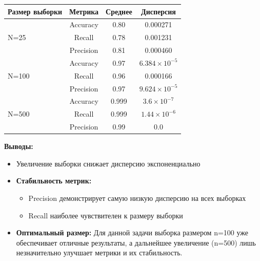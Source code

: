 \begin{table}[h]
    \centering
    \begin{tabular}{lccc}
    \toprule
    \textbf{Размер выборки} & \textbf{Метрика} & \textbf{Среднее} & \textbf{Дисперсия} \\
    \midrule
    \multirow{3}{*}{N=25} 
     & Accuracy  & 0.80  & 0.000271 \\
     & Recall    & 0.78  & 0.001231 \\
     & Precision & 0.81  & 0.000460 \\
    \midrule
    \multirow{3}{*}{N=100}
     & Accuracy  & 0.97  & $6.384 \times 10^{-5}$ \\
     & Recall    & 0.96  & 0.000166 \\
     & Precision & 0.97  & $9.624 \times 10^{-5}$ \\
    \midrule
    \multirow{3}{*}{N=500}
     & Accuracy  & 0.999 & $3.6 \times 10^{-7}$ \\
     & Recall    & 0.999 & $1.44 \times 10^{-6}$ \\
     & Precision & 0.99  & 0.0 \\
    \bottomrule
    \end{tabular}
\end{table}

\noindent\textbf{Выводы:}
\begin{itemize}
    \item Увеличение выборки снижает дисперсию экспоненциально

    \item \textbf{Стабильность метрик:}
        \begin{itemize}
            \item Precision демонстрирует самую низкую дисперсию на всех выборках
            \item Recall наиболее чувствителен к размеру выборки

        \end{itemize}
    
    \item \textbf{Оптимальный размер:} Для данной задачи выборка размером n=100 уже обеспечивает отличные результаты, а дальнейшее увеличение (n=500) лишь незначительно улучшает метрики и их стабильность.
\end{itemize}

\restoregeometry
